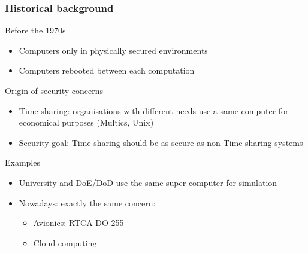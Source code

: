 


\begin{reveals}
		
\maketitle





\begin{frame}
  \frametitle{Historical background}

  \begin{block}{Before the  1970s}
    \begin{itemize}
    \item Computers only in physically secured environments
    \item Computers rebooted between each computation
    \end{itemize}
  \end{block}

  \pause
  
  \begin{block}{Origin of security concerns}
    \begin{itemize}
    \item Time-sharing: organisations with different needs use a same
      computer for economical purposes (Multics, Unix)
    \item Security goal: Time-sharing should be as secure as non-Time-sharing systems
    \end{itemize}
  \end{block}

  \pause

  \begin{block}{Examples}
    \begin{itemize}
    \item University and DoE/DoD use the same super-computer for simulation
    \item Nowadays: exactly the same concern:
      \begin{itemize}
      \item Avionics: RTCA DO-255
      \item Cloud computing
      \end{itemize}
    \end{itemize}
  \end{block}

\end{frame}


\end{reveals}
